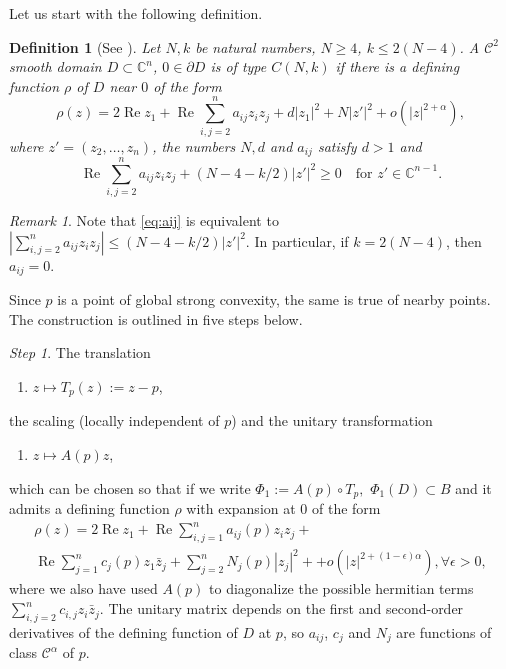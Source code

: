 \documentclass[a4paper,12pt]{amsart}
\def\re{\operatorname{Re}}
\newtheorem{definition}[theorem]{Definition}
\theoremstyle{remark}\newtheorem{remark}[theorem]{Remark}
\begin{document}

Let us start with the following definition.
\begin{definition}[See {\cite[Definition 3.1]{FM}}]
Let $N,k$ be natural numbers, $N\geq 4$, $k\leq  2(N-4)$. A $\mathcal C^2$ smooth domain $D\subset \mathbb C^n$, $0\in \partial D$ is of type $C(N,k)$ if there is a defining function $\rho$ of $D$ near $0$ of the form 
\begin{equation*}
\rho(z) = 2 \re z_1 + \re \sum_{i,j=2}^n a_{ij} z_i z_j + d |z_1|^2  + N|z'|^2 + o(|z|^{2+\alpha}),
\end{equation*}
where $z'=(z_2,\dots,z_n)$, the numbers $N, d$ and $a_{ij}$ satisfy $d>1$ and 
\begin{equation}\label{eq:aij}
\re \sum_{i,j=2}^n a_{ij} z_i z_j + (N-4 - k/2) |z'|^2 \geq 0 \quad \text{for } z'\in\mathbb C^{n-1}.
\end{equation}
\end{definition}
\begin{remark}\label{CNK}Note that \eqref{eq:aij} is equivalent to $|\sum_{i,j=2}^n a_{ij} z_i z_j| \leq (N-4 - k/2) |z'|^2$. In particular, if $k= 2(N-4)$, then $a_{ij}=0$.
\end{remark}


Since $p$ is a point of global strong convexity, the same is true of nearby points. The construction is outlined in five steps below.

\medskip

{\it Step 1}. The translation 
\begin{enumerate}
\item[$i)$] $z\mapsto T_p(z):=z-p$,
\end{enumerate} 
the scaling (locally independent of $p$) and the 
unitary transformation
\begin{enumerate}
\item[$ii)$] $z \mapsto A(p)z$,
\end{enumerate}
which can be chosen so that if we write $\Phi_1:=A(p)\circ T_p,$
$\Phi_1(D)\subset B$ and it admits
a defining function $\rho$ 
with expansion at 
$0$ of the form  
\begin{multline*}\rho(z) = 2\re z_1 + \re \sum_{i,j=1}^n a_{ij}(p)z_i z_j +\\ \re \sum_{j=1}^n c_j(p) z_1 \bar z_j + \sum_{j=2}^n N_j(p)|z_j|^2 +  + o(|z|^{2+(1-\epsilon)\alpha}),
\forall \epsilon >0,
\end{multline*}
where we also have used $A(p)$ to diagonalize the possible hermitian terms
$\sum_{i,j=2}^n c_{i,j} z_i\bar z_j$.
The unitary matrix depends on the first and second-order derivatives of the defining function of $D$ at $p$, so $a_{ij}$, $c_j$ and $N_j$ are functions of class $\mathcal C^\alpha$ of $p$. 
\end{document}
